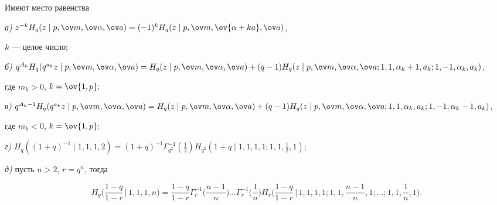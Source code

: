  


\begin{thms} 


Имеют место равенства 


 


{\em а)} $z^{-k}H_q(z\mid p,\ov m,\ov\alpha,\ov a)=(-1)^k H_q 


(z\mid p,\ov m,\ov{\alpha+k a},\ov a)$, 


$k$ --- целое число$;$ 


 


{\em б)} $q^{A_k}H_q(q^{a_k}z\mid p,\ov m,\ov\alpha,\ov a)= 


H_q(z\mid p,\ov m,\ov\alpha,\ov a)+(q-1)H_q(z\mid 


p,\ov m,\ov\alpha,\ov a;1,1,\alpha_k+1,a_k;1,-1,\alpha_k,a_k)$, 


где $m_k>0$, $k=\ov{1,p};$ 


 


{\em в)} $q^{A_k-1}H_q(q^{a_k}z\mid p,\ov m,\ov\alpha,\ov a)=H_q(z\mid 


p,\ov m,\ov\alpha,\ov a)+(q-1)H_q(z\mid 


p,\ov m,\ov\alpha,\ov a;1,1,\alpha_k,a_k;1,-1,\linebreak


\alpha_k-1,a_k)$, 


где $m_k<0$, $k=\ov{1,p};$ 


 


{\em г)} $H_q((1+q)^{-1}\mid 1,1,1,2)=(1+q)^{-1}\Gamma^{-1}_{q^2} 


(\frac{1}{2})H_{q^2}(1+q\mid 1,1,1,1;1,1,\frac{1}{2},1);$ 


 


{\em д)} пусть $n>2$, $r=q^n$, тогда 


$$ 


H_q\bigg(\frac{1-q}{1-r}\,\bigg|\,1,1,1,n \bigg)= 


\frac{1-q}{1-r}\Gamma^{-1}_r\bigg(\frac{n-1}{n} \bigg)\dotsc 


\Gamma^{-1}_r\bigg(\frac{1}{n} \bigg)H_r 


\bigg(\frac{1-q}{1-r}\,\bigg|\,1,1,1,1; 1,1,\frac{n-1}{n},1; 


\dotsc;1,1,\frac{1}{n},1 \bigg). 


$$ 


\end{thms} 


